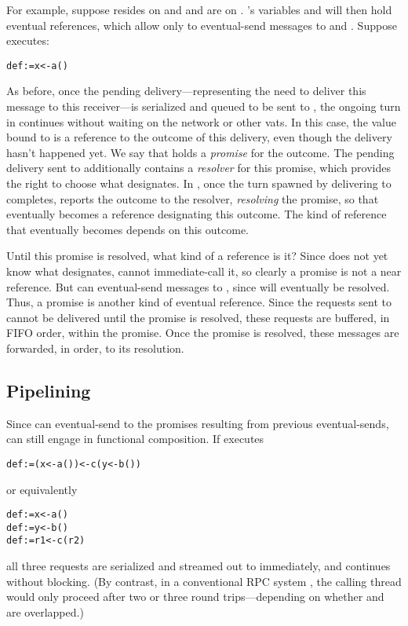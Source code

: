 \documentclass{llncs}
\begin{document}
For example, suppose  resides on  and  and
 are on . 's variables  and  will
then hold eventual references, which allow  only to
eventual-send messages to  and . Suppose 
executes:
%
\begin{alltt}
    def  := x <- a()
\end{alltt}
%
As before, once the pending delivery---representing the need to
deliver this message to this receiver---is serialized and queued to be
sent to , the ongoing turn in  continues without waiting
on the network or other vats. In this case, the value bound to
 is a reference to the outcome of this delivery, even though
the delivery hasn't happened yet. We say that  holds a
\emph{promise} for the outcome. The pending delivery sent to 
additionally contains a \emph{resolver} for this promise, which
provides the right to choose what  designates. In ,
once the turn spawned by delivering  to  completes,
 reports the outcome to the resolver, \emph{resolving} the
promise, so that  eventually becomes a reference designating
this outcome. The kind of reference that  eventually becomes
depends on this outcome.

Until this promise is resolved, what kind of a reference is it? Since
 does not yet know what  designates,  cannot
immediate-call it, so clearly a promise is not a near reference. But
 can eventual-send messages to , since  will
eventually be resolved.  Thus, a promise is another kind of eventual
reference. Since the requests sent to  cannot be delivered
until the promise is resolved, these requests are buffered, in FIFO
order, within the promise. Once the promise is resolved, these
messages are forwarded, in order, to its resolution.

\subsection{Pipelining}

Since  can eventual-send to the promises resulting from
previous eventual-sends,  can still engage in functional
composition. If  executes
%
\begin{alltt}
    def  := (x <- a()) <- c(y <- b())
\end{alltt}
%
or equivalently
%
\begin{alltt}
    def  := x <- a()
    def  := y <- b()
    def  := r1 <- c(r2)
\end{alltt}
%
all three requests are serialized and streamed out to 
immediately, and  continues without blocking. (By contrast, in
a conventional RPC system
\cite{Nelson81,java:rmi,corba:latency,xml-rpc:latency}, the calling
thread would only proceed after two or three round trips---depending
on whether  and  are overlapped.)
\end{document}

